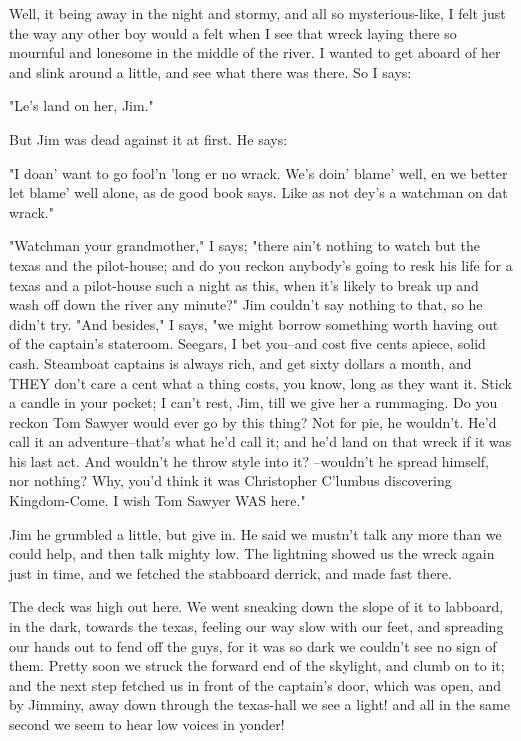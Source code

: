 Well, it being away in the night and stormy, and all so mysterious-like,
I felt just the way any other boy would a felt when I see that wreck
laying there so mournful and lonesome in the middle of the river.  I
wanted to get aboard of her and slink around a little, and see what there
was there.  So I says:

"Le's land on her, Jim."

But Jim was dead against it at first.  He says:

"I doan' want to go fool'n 'long er no wrack.  We's doin' blame' well, en
we better let blame' well alone, as de good book says.  Like as not dey's
a watchman on dat wrack."

"Watchman your grandmother," I says; "there ain't nothing to watch but
the texas and the pilot-house; and do you reckon anybody's going to resk
his life for a texas and a pilot-house such a night as this, when it's
likely to break up and wash off down the river any minute?"  Jim couldn't
say nothing to that, so he didn't try.  "And besides," I says, "we might
borrow something worth having out of the captain's stateroom.  Seegars, I
bet you--and cost five cents apiece, solid cash.  Steamboat captains is
always rich, and get sixty dollars a month, and THEY don't care a cent
what a thing costs, you know, long as they want it.  Stick a candle in
your pocket; I can't rest, Jim, till we give her a rummaging.  Do you
reckon Tom Sawyer would ever go by this thing?  Not for pie, he wouldn't.
He'd call it an adventure--that's what he'd call it; and he'd land on
that wreck if it was his last act.  And wouldn't he throw style into it?
--wouldn't he spread himself, nor nothing?  Why, you'd think it was
Christopher C'lumbus discovering Kingdom-Come.  I wish Tom Sawyer WAS
here."

Jim he grumbled a little, but give in.  He said we mustn't talk any more
than we could help, and then talk mighty low.  The lightning showed us
the wreck again just in time, and we fetched the stabboard derrick, and
made fast there.

The deck was high out here.  We went sneaking down the slope of it to
labboard, in the dark, towards the texas, feeling our way slow with our
feet, and spreading our hands out to fend off the guys, for it was so
dark we couldn't see no sign of them.  Pretty soon we struck the forward
end of the skylight, and clumb on to it; and the next step fetched us in
front of the captain's door, which was open, and by Jimminy, away down
through the texas-hall we see a light! and all in the same second we seem
to hear low voices in yonder!


